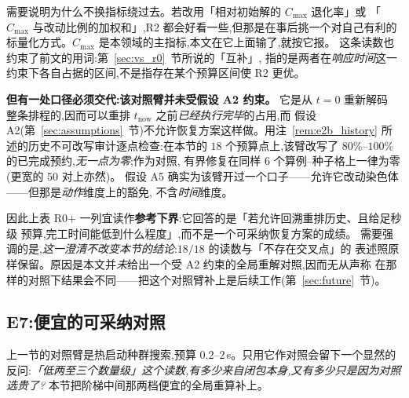 \documentclass[manuscript,screen,review]{acmart}
\newcommand{\NPairs}{50}
\newcommand{\RzeroPastLo}{80\%}
\newcommand{\RzeroPastHi}{100\%}
\begin{document}
需要说明为什么不换指标绕过去。若改用「相对初始解的 \(C_{\max}\) 退化率」或
「\(C_{\max}\) 与改动比例的加权和」,R2 都会好看一些,但那是在事后挑一个对自己有利的
标量化方式。\(C_{\max}\) 是本领域的主指标,本文在它上面输了,就按它报。
这条读数也约束了前文的用词:第~\ref{sec:vs_r0}~节所说的「互补」,
指的是两者在\emph{响应时间}这一约束下各自占据的区间,不是指存在某个预算区间使 R2 更优。

\textbf{但有一处口径必须交代:该对照臂并未受假设 A2 约束。} 它是从 \(t=0\) 重新解码
整条排程的,因而可以重排 \(t_{\mathrm{now}}\) 之前\emph{已经执行完毕}的占用,而
假设 A2(第~\ref{sec:assumptions}~节)不允许恢复方案这样做。用注~\ref{rem:e2b_history}
所述的历史不可改写审计逐点检查:在本节的 \(18\) 个预算点上,该臂改写了
\(\RzeroPastLo\)--\(\RzeroPastHi\) 的已完成预约,\emph{无一点为零};作为对照,
有界修复在同样 \(6\) 个算例--种子格上一律为零(更宽的 \(\NPairs\) 对上亦然)。
假设 A5 确实为该臂开过一个口子——允许它改动染色体——但那是\emph{动作}维度上的豁免,
不含\emph{时间}维度。

因此上表 R0+ 一列宜读作\textbf{参考下界}:它回答的是「若允许回溯重排历史、且给足秒级
预算,完工时间能低到什么程度」,而不是一个可采纳恢复方案的成绩。
需要强调的是,\emph{这一澄清不改变本节的结论}:\(18/18\) 的读数与「不存在交叉点」的
表述照原样保留。原因是本文并\emph{未}给出一个受 A2 约束的全局重解对照,因而无从声称
在那样的对照下结果会不同——把这个对照臂补上是后续工作(第~\ref{sec:future}~节)。

\subsection{E7:便宜的可采纳对照}
\label{sec:cheap}

上一节的对照臂是热启动种群搜索,预算 \(0.2\)--\(2\)\,s。只用它作对照会留下一个显然的
反问:\emph{「低两至三个数量级」这个读数,有多少来自闭包本身,又有多少只是因为对照选贵了?}
本节把阶梯中间那两档便宜的全局重算补上。
\end{document}
